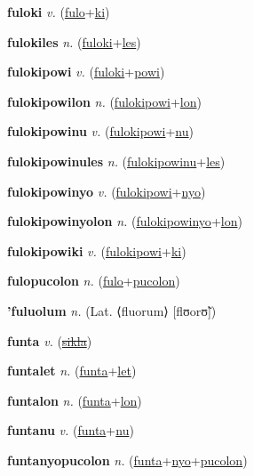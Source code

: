 \textbf{\hypertarget{fuloki}{fuloki}} \textit{v.} (\hyperlink{fulo}{fulo}+\allowbreak \hyperlink{ki}{ki})


\textbf{\hypertarget{fulokiles}{fulokiles}} \textit{n.} (\hyperlink{fuloki}{fuloki}+\allowbreak \hyperlink{les}{les})


\textbf{\hypertarget{fulokipowi}{fulokipowi}} \textit{v.} (\hyperlink{fuloki}{fuloki}+\allowbreak \hyperlink{powi}{powi})


\textbf{\hypertarget{fulokipowilon}{fulokipowilon}} \textit{n.} (\hyperlink{fulokipowi}{fulokipowi}+\allowbreak \hyperlink{lon}{lon})


\textbf{\hypertarget{fulokipowinu}{fulokipowinu}} \textit{v.} (\hyperlink{fulokipowi}{fulokipowi}+\allowbreak \hyperlink{nu}{nu})


\textbf{\hypertarget{fulokipowinules}{fulokipowinules}} \textit{n.} (\hyperlink{fulokipowinu}{fulokipowinu}+\allowbreak \hyperlink{les}{les})


\textbf{\hypertarget{fulokipowinyo}{fulokipowinyo}} \textit{v.} (\hyperlink{fulokipowi}{fulokipowi}+\allowbreak \hyperlink{nyo}{nyo})


\textbf{\hypertarget{fulokipowinyolon}{fulokipowinyolon}} \textit{n.} (\hyperlink{fulokipowinyo}{fulokipowinyo}+\allowbreak \hyperlink{lon}{lon})


\textbf{\hypertarget{fulokipowiki}{fulokipowiki}} \textit{v.} (\hyperlink{fulokipowi}{fulokipowi}+\allowbreak \hyperlink{ki}{ki})


\textbf{\hypertarget{fulopucolon}{fulopucolon}} \textit{n.} (\hyperlink{fulo}{fulo}+\allowbreak \hyperlink{pucolon}{pucolon})


\textbf{\hypertarget{'fuluolum}{'fuluolum}} \textit{n.} (Lat. ⟨fluorum⟩ [flʊorʊ̃])


\textbf{\hypertarget{funta}{funta}} \textit{v.} (\hyperlink{sikla}{\sout{sikla}})


\textbf{\hypertarget{funtalet}{funtalet}} \textit{n.} (\hyperlink{funta}{funta}+\allowbreak \hyperlink{let}{let})


\textbf{\hypertarget{funtalon}{funtalon}} \textit{n.} (\hyperlink{funta}{funta}+\allowbreak \hyperlink{lon}{lon})


\textbf{\hypertarget{funtanu}{funtanu}} \textit{v.} (\hyperlink{funta}{funta}+\allowbreak \hyperlink{nu}{nu})


\textbf{\hypertarget{funtanyopucolon}{funtanyopucolon}} \textit{n.} (\hyperlink{funta}{funta}+\allowbreak \hyperlink{nyo}{nyo}+\allowbreak \hyperlink{pucolon}{pucolon})


